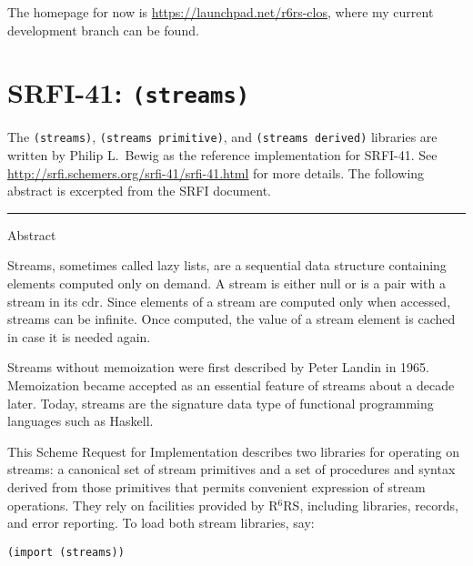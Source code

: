 \documentclass[onecolumn, 12pt, twoside, openright, dvipdfm]{book}
\newcommand{\rnrs}[1]{R$^{\mathrm{#1}}$RS}
\begin{document}
The homepage for now is \url{https://launchpad.net/r6rs-clos}, where
my current development branch can be found.



\newpage
\section{SRFI-41: \texttt{(streams)}}
The \texttt{(streams)}, \texttt{(streams~primitive)}, and
\texttt{(streams~derived)} libraries are written by Philip L.~Bewig 
as the reference implementation for SRFI-41.  
See \url{http://srfi.schemers.org/srfi-41/srfi-41.html} for more
details.  The following abstract is excerpted from the SRFI document.
\nocite{srfi41}

\begin{center}
\rule{\textwidth}{1pt}
Abstract
\end{center}

Streams, sometimes called lazy lists, are a sequential data
structure containing elements computed only on demand. A stream is
either null or is a pair with a stream in its cdr. Since elements of
a stream are computed only when accessed, streams can be infinite.
Once computed, the value of a stream element is cached in case it is
needed again.

Streams without memoization were first described by Peter Landin in
1965. Memoization became accepted as an essential feature of streams
about a decade later. Today, streams are the signature data type of
functional programming languages such as Haskell.

This Scheme Request for Implementation describes two libraries for
operating on streams: a canonical set of stream primitives and a set
of procedures and syntax derived from those primitives that permits
convenient expression of stream operations. They rely on facilities
provided by \rnrs{6}, including libraries, records, and error reporting.
To load both stream libraries, say:

\texttt{(import (streams))}
\end{document}
